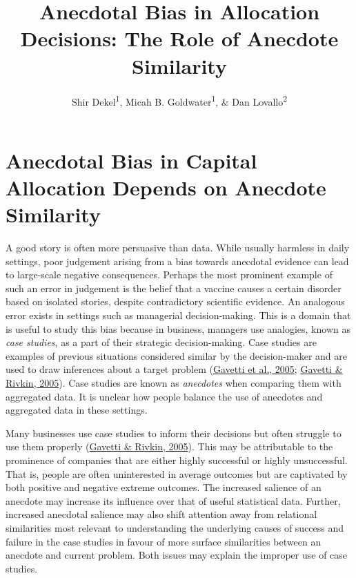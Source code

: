 \documentclass[
  man, donotrepeattitle,floatsintext]{apa7}
\title{Anecdotal Bias in Allocation Decisions: The Role of Anecdote Similarity}
\author{Shir Dekel\textsuperscript{1}, Micah B. Goldwater\textsuperscript{1}, \& Dan Lovallo\textsuperscript{2}}
\date{}
\affiliation{\vspace{0.5cm}\textsuperscript{1} The University of Sydney, School of Psychology\\\textsuperscript{2} The University of Sydney, Business School}
\theoremstyle{definition}
\theoremstyle{definition}
\theoremstyle{definition}
\theoremstyle{definition}
\theoremstyle{remark}
\begin{document}
\maketitle



















\hypertarget{anecdotal-bias-in-capital-allocation-depends-on-anecdote-similarity}{%
\section{Anecdotal Bias in Capital Allocation Depends on Anecdote Similarity}\label{anecdotal-bias-in-capital-allocation-depends-on-anecdote-similarity}}

A good story is often more persuasive than data. While usually harmless in daily
settings, poor judgement arising from a bias towards anecdotal evidence can lead
to large-scale negative consequences. Perhaps the most prominent example of such
an error in judgement is the belief that a vaccine causes a certain disorder
based on isolated stories, despite contradictory scientific evidence. An
analogous error exists in settings such as managerial decision-making. This is a
domain that is useful to study this bias because in business, managers use
analogies, known as \emph{case studies}, as a part of their strategic
decision-making. Case studies are examples of previous situations considered
similar by the decision-maker and are used to draw inferences about a target
problem (\protect\hyperlink{ref-gavetti2005}{Gavetti et al., 2005}; \protect\hyperlink{ref-gavetti2005a}{Gavetti \& Rivkin, 2005}). Case studies are known as \emph{anecdotes}
when comparing them with aggregated data. It is unclear how people balance the
use of anecdotes and aggregated data in these settings.

Many businesses use case studies to inform their decisions but often struggle to
use them properly (\protect\hyperlink{ref-gavetti2005a}{Gavetti \& Rivkin, 2005}). This may be attributable to the prominence of
companies that are either highly successful or highly unsuccessful. That is,
people are often uninterested in average outcomes but are captivated by both
positive and negative extreme outcomes. The increased salience of an anecdote
may increase its influence over that of useful statistical data. Further,
increased anecdotal salience may also shift attention away from relational
similarities most relevant to understanding the underlying causes of success and
failure in the case studies in favour of more surface similarities between an
anecdote and current problem. Both issues may explain the improper use of case
studies.
\end{document}
